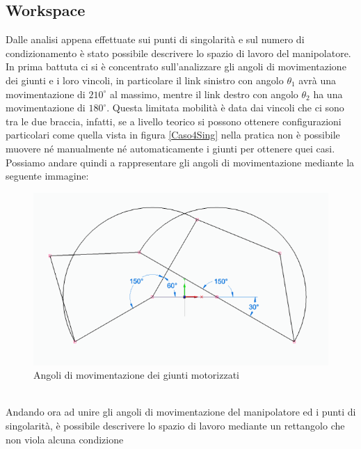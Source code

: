 \subsection{Workspace}
Dalle analisi appena effettuate sui punti di singolarità e sul numero di condizionamento è stato possibile descrivere lo spazio di lavoro del manipolatore. In prima battuta ci si è concentrato sull'analizzare gli angoli di movimentazione dei giunti e i loro vincoli, in particolare il link sinistro con angolo $\theta_1$ avrà una movimentazione di $210^\circ$ al massimo, mentre il link destro con angolo $\theta_2$ ha una movimentazione di $180^\circ$. Questa limitata mobilità è data dai vincoli che ci sono tra le due braccia, infatti, se a livello teorico si possono ottenere configurazioni particolari come quella vista in figura \ref{Caso4Sing} nella pratica non è possibile muovere né manualmente né automaticamente i giunti per ottenere quei casi. Possiamo andare quindi a rappresentare gli angoli di movimentazione mediante la seguente immagine: 
\begin{figure}[ht]
	\begin{center}
		\includegraphics[scale=0.7]{Immagini/Singolarity/workangle}
		\caption{Angoli di movimentazione dei giunti motorizzati}
	\end{center}
\end{figure}
\\Andando ora ad unire gli angoli di movimentazione del manipolatore ed i punti di singolarità, è possibile descrivere lo spazio di lavoro mediante un rettangolo che non viola alcuna condizione
